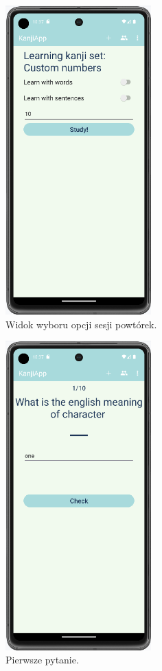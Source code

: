 \documentclass[a4paper,twoside,12pt]{book}
\begin{document}
\begin{figure}[]
\centering
\includegraphics[width=0.5\textwidth]{learn/options}
\caption{Widok wyboru opcji sesji powtórek.}
\label{fig:options}
\end{figure}

\begin{figure}[]
\centering
\includegraphics[width=0.5\textwidth]{learn/start}
\caption{Pierwsze pytanie.}
\label{fig:start}
\end{figure}
\end{document}

